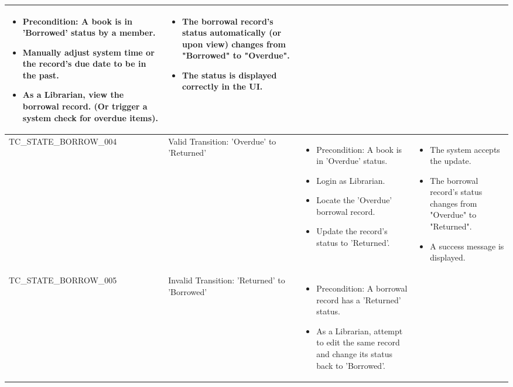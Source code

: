 \begin{longtable}{|>{\scriptsize\raggedright\arraybackslash}p{4cm}|>{\raggedright\arraybackslash}p{3cm}|>{\raggedright\arraybackslash}p{4cm}|>{\raggedright\arraybackslash}p{4cm}|}
\begin{itemize}[noitemsep, topsep=0pt, partopsep=0pt, leftmargin=*]
        \item Precondition: A book is in 'Borrowed' status by a member.
        \item Manually adjust system time or the record's due date to be in the past.
        \item As a Librarian, view the borrowal record. (Or trigger a system check for overdue items).
    \end{itemize} & 
    \begin{itemize}[noitemsep, topsep=0pt, partopsep=0pt, leftmargin=*]
        \item The borrowal record's status automatically (or upon view) changes from "Borrowed" to "Overdue".
        \item The status is displayed correctly in the UI.
    \end{itemize} \\ \hline
TC\_STATE\_BORROW\_004 & Valid Transition: 'Overdue' to 'Returned' & 
    \begin{itemize}[noitemsep, topsep=0pt, partopsep=0pt, leftmargin=*]
        \item Precondition: A book is in 'Overdue' status.
        \item Login as Librarian.
        \item Locate the 'Overdue' borrowal record.
        \item Update the record's status to 'Returned'. 
    \end{itemize} & 
    \begin{itemize}[noitemsep, topsep=0pt, partopsep=0pt, leftmargin=*]
        \item The system accepts the update.
        \item The borrowal record's status changes from "Overdue" to "Returned".
        \item A success message is displayed.
    \end{itemize} \\ \hline
TC\_STATE\_BORROW\_005 & Invalid Transition: 'Returned' to 'Borrowed' & 
    \begin{itemize}[noitemsep, topsep=0pt, partopsep=0pt, leftmargin=*]
        \item Precondition: A borrowal record has a 'Returned' status.
        \item As a Librarian, attempt to edit the same record and change its status back to 'Borrowed'.
    \end{itemize} & 
    \begin{itemize}[noitemsep, topsep=0pt, partopsep=0pt, leftmargin=*]

\end{itemize}
\end{longtable}
